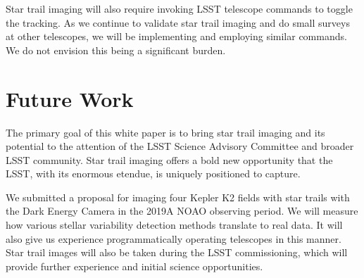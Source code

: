 \documentclass[12pt, letterpaper]{article}
\begin{document}
Star trail imaging will also require invoking LSST telescope commands to toggle the tracking. As we continue to validate star trail imaging and do small surveys at other telescopes, we will be implementing and employing similar commands. We do not envision this being a significant burden.

\section{Future Work}
\label{sec:future}

The primary goal of this white paper is to bring star trail imaging and its potential to the attention of the LSST Science Advisory Committee and broader LSST community. Star trail imaging offers a bold new opportunity that the LSST, with its enormous etendue, is uniquely positioned to capture. 


We submitted a proposal for imaging four Kepler K2 fields with star trails with the Dark Energy Camera in the 2019A NOAO observing period. We will measure how various stellar variability detection methods translate to real data. It will also give us experience programmatically operating telescopes in this manner. Star trail images will also be taken during the LSST commissioning, which will provide further experience and initial science opportunities. 



\end{document}
